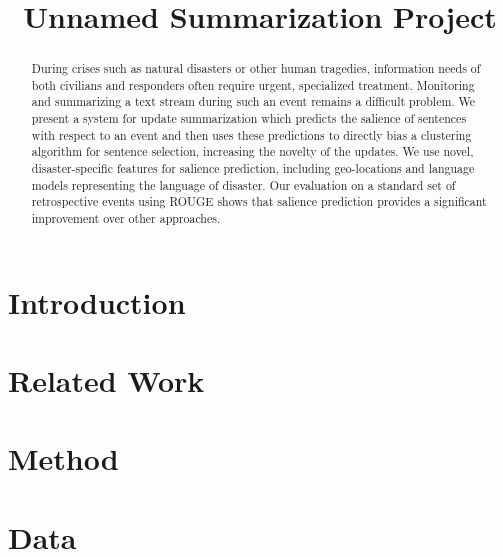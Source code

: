 \documentclass[11pt]{article}
\title{Unnamed Summarization Project}
\date{}
\begin{document}
\maketitle
\begin{abstract}
During crises such as natural disasters or other human tragedies, information
needs of both civilians and responders often require urgent, specialized
treatment.  
Monitoring and summarizing a text stream
during such an event remains a difficult problem. 
We present a system for update summarization which predicts the salience of 
sentences with respect to an event and then uses these
predictions to directly bias a clustering algorithm for sentence selection,
increasing the novelty of the updates. We use novel, disaster-specific features
for salience prediction, including geo-locations and language models
representing the language of disaster.
Our evaluation on a standard set of retrospective events using ROUGE shows 
that salience prediction provides a significant improvement over 
other approaches.



\end{abstract}

\section{Introduction}



\section{Related Work}


\section{Method}


\section{Data}
\label{sec:data}

\end{document}
